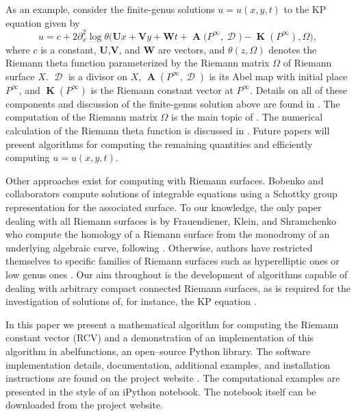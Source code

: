 \documentclass[12pt]{article}
\theoremstyle{definition}
\DeclareMathOperator{\DivD}{\mathcal{D}}
\DeclareMathOperator{\RCV}{\boldsymbol{K}}
\DeclareMathOperator{\Abel}{\boldsymbol{A}}
\begin{document}
As an example, consider the finite-genus solutions $u = u(x,y,t)$ to the
KP equation given by
\begin{equation} \label{eqn:kp}
  u = c + 2 \partial_x^2 \log \theta\Big( \boldsymbol{U}x +
  \boldsymbol{V}y + \boldsymbol{W}t + \Abel\big(P^\infty,\DivD\big) -
  \RCV(P^\infty), \Omega \Big),
\end{equation}
where $c$ is a constant, $\boldsymbol{U}$,$\boldsymbol{V}$, and
$\boldsymbol{W}$ are vectors, and $\theta(z,\Omega)$ denotes the Riemann
theta function parameterized by the Riemann matrix $\Omega$ of Riemann
surface $X$. $\DivD$ is a divisor on $X$, $\Abel(P^\infty,\DivD)$ is its
Abel map with initial place $P^\infty$, and $\RCV(P^\infty)$ is the
Riemann constant vector at $P^\infty$. Details on all of these
components and discussion of the finite-genus solution above are found
in \cite{belokolos,Dubrovin81}. The computation of the Riemann matrix
$\Omega$ is the main topic of \cite{dvh1}. The numerical calculation of
the Riemann theta function is discussed in \cite{DHBvHS03}. Future
papers will present algorithms for computing the remaining quantities
and efficiently computing $u = u(x,y,t)$.

Other approaches exist for computing with Riemann surfaces. Bobenko and
collaborators \cite{belokolos, BobenkoBordag89} compute solutions of
integrable equations using a Schottky group representation for the
associated surface. To our knowledge, the only paper dealing with all
Riemann surfaces is by Frauendiener, Klein, and Shramchenko who compute
the homology of a Riemann surface from the monodromy of an underlying
algebraic curve, following \cite{dvh1}. Otherwise, authors have
restricted themselves to specific families of Riemann surfaces such as
hyperelliptic ones \cite{FrauendienerKlein06,FrauendienerKlein15} or low
genus ones \cite{DFS97,FinkelSegur85,DeconinckSwierczewski13}. Our aim
throughout is the development of algorithms capable of dealing with
arbitrary compact connected Riemann surfaces, as is required for the
investigation of solutions of, for instance, the KP equation
\cite{DS98,Shiota86}.

In this paper we present a mathematical algorithm for computing the
Riemann constant vector (RCV) and a demonstration of an implementation
of this algorithm in {\sc abelfunctions}, an open--source Python
library. The software implementation details, documentation, additional
examples, and installation instructions are found on the project website
\cite{abelfunctions}. The computational examples are presented in the
style of an iPython notebook. The notebook itself can be downloaded from
the project website.
\end{document}
